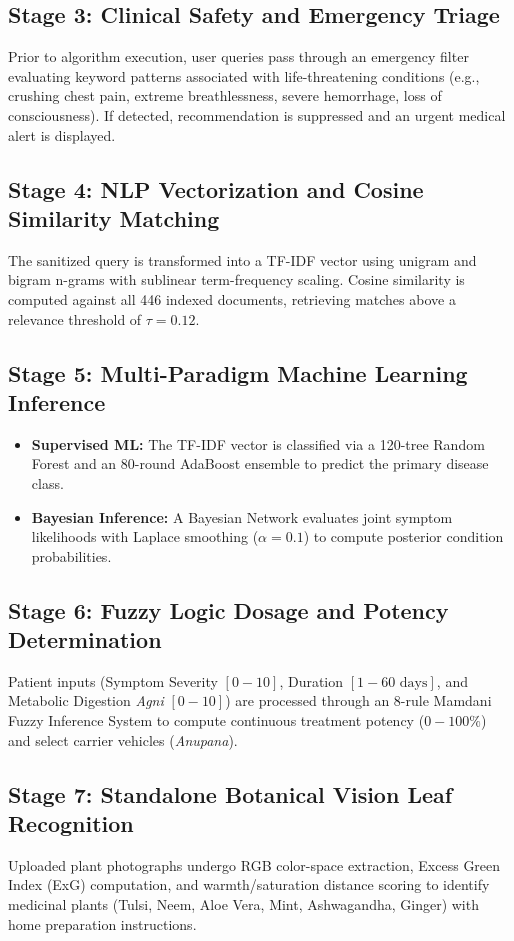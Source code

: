 \documentclass[12pt,a4paper]{article}
\begin{document}
\subsection{Stage 3: Clinical Safety and Emergency Triage}
Prior to algorithm execution, user queries pass through an emergency filter evaluating keyword patterns associated with life-threatening conditions (e.g., crushing chest pain, extreme breathlessness, severe hemorrhage, loss of consciousness). If detected, recommendation is suppressed and an urgent medical alert is displayed.

\subsection{Stage 4: NLP Vectorization and Cosine Similarity Matching}
The sanitized query is transformed into a TF-IDF vector using unigram and bigram n-grams with sublinear term-frequency scaling. Cosine similarity is computed against all 446 indexed documents, retrieving matches above a relevance threshold of $\tau = 0.12$.

\subsection{Stage 5: Multi-Paradigm Machine Learning Inference}
\begin{itemize}
    \item \textbf{Supervised ML:} The TF-IDF vector is classified via a 120-tree Random Forest and an 80-round AdaBoost ensemble to predict the primary disease class.
    \item \textbf{Bayesian Inference:} A Bayesian Network evaluates joint symptom likelihoods with Laplace smoothing ($\alpha=0.1$) to compute posterior condition probabilities.
\end{itemize}

\subsection{Stage 6: Fuzzy Logic Dosage and Potency Determination}
Patient inputs (Symptom Severity $[0-10]$, Duration $[1-60\text{ days}]$, and Metabolic Digestion \textit{Agni} $[0-10]$) are processed through an 8-rule Mamdani Fuzzy Inference System to compute continuous treatment potency ($0-100\%$) and select carrier vehicles (\textit{Anupana}).

\subsection{Stage 7: Standalone Botanical Vision Leaf Recognition}
Uploaded plant photographs undergo RGB color-space extraction, Excess Green Index (ExG) computation, and warmth/saturation distance scoring to identify medicinal plants (Tulsi, Neem, Aloe Vera, Mint, Ashwagandha, Ginger) with home preparation instructions.
\end{document}
